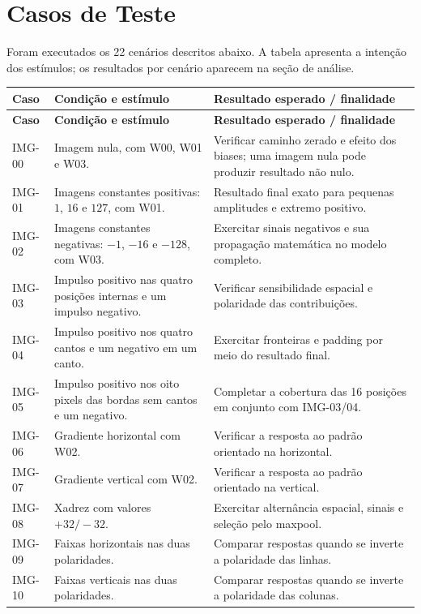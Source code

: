 \section{Casos de Teste}
Foram executados os 22 cenários descritos abaixo. A tabela apresenta a intenção dos estímulos; os resultados por cenário aparecem na seção de análise.

\small
\begin{longtable}{p{1.5cm}p{10.8cm}p{10.8cm}}
\toprule\textbf{Caso} & \textbf{Condição e estímulo} & \textbf{Resultado esperado / finalidade}\\\midrule
\endfirsthead
\toprule\textbf{Caso} & \textbf{Condição e estímulo} & \textbf{Resultado esperado / finalidade}\\\midrule
\endhead
IMG-00 & Imagem nula, com W00, W01 e W03. & Verificar caminho zerado e efeito dos biases; uma imagem nula pode produzir resultado não nulo.\\
IMG-01 & Imagens constantes positivas: $1$, $16$ e $127$, com W01. & Resultado final exato para pequenas amplitudes e extremo positivo.\\
IMG-02 & Imagens constantes negativas: $-1$, $-16$ e $-128$, com W03. & Exercitar sinais negativos e sua propagação matemática no modelo completo.\\
IMG-03 & Impulso positivo nas quatro posições internas e um impulso negativo. & Verificar sensibilidade espacial e polaridade das contribuições.\\
IMG-04 & Impulso positivo nos quatro cantos e um negativo em um canto. & Exercitar fronteiras e padding por meio do resultado final.\\
IMG-05 & Impulso positivo nos oito pixels das bordas sem cantos e um negativo. & Completar a cobertura das 16 posições em conjunto com IMG-03/04.\\
IMG-06 & Gradiente horizontal com W02. & Verificar a resposta ao padrão orientado na horizontal.\\
IMG-07 & Gradiente vertical com W02. & Verificar a resposta ao padrão orientado na vertical.\\
IMG-08 & Xadrez com valores $+32/-32$. & Exercitar alternância espacial, sinais e seleção pelo maxpool.\\
IMG-09 & Faixas horizontais nas duas polaridades. & Comparar respostas quando se inverte a polaridade das linhas.\\
IMG-10 & Faixas verticais nas duas polaridades. & Comparar respostas quando se inverte a polaridade das colunas.\\

\end{longtable}
